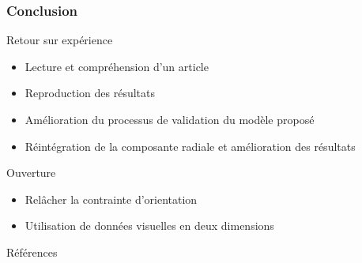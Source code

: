 \documentclass{beamer}
\begin{document}
\begin{frame}
  \frametitle{Conclusion}
  \begin{block}{Retour sur expérience}
    \begin{itemize}
      \item Lecture et compréhension d'un article
      \item Reproduction des résultats
      \item Amélioration du processus de validation du modèle proposé
      \item Réintégration de la composante radiale et amélioration des résultats    
    \end{itemize}
  \end{block}
  \begin{block}{Ouverture}
    \begin{itemize}
      \item Relâcher la contrainte d'orientation
      \item Utilisation de données visuelles en deux dimensions
    \end{itemize}
  \end{block}
\end{frame}

\begin{frame}{Références}
  \nocite{*}
  
  
\end{frame}
\end{document}

